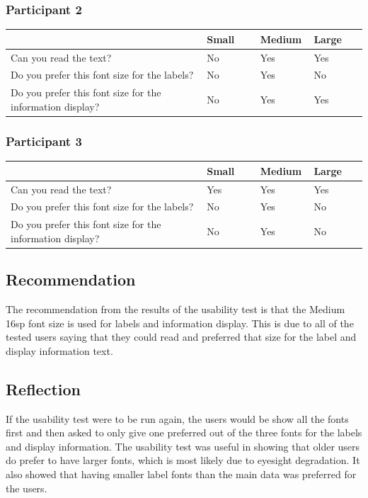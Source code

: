 \documentclass[11pt,english,numbers=endperiod,parskip=half]{scrartcl}
\begin{document}
\subsubsection{Participant 2}
\begin{table}[H]
	\begin{tabular}{| p{0.55\linewidth} | p{0.15\linewidth} | p{0.15\linewidth} | p{0.15 \linewidth} |}
		\hline
			&	Small	&	Medium	&	Large \\ \hline
		Can you read the text?	& No & Yes	& Yes \\ \hline
		Do you prefer this font size for the labels? & No & Yes & No \\ \hline
		Do you prefer this font size for the information display? & No & Yes & Yes \\
		\hline
	\end{tabular}
\end{table}

\subsubsection{Participant 3}
\begin{table}[H]
	\begin{tabular}{| p{0.55\linewidth} | p{0.15\linewidth} | p{0.15\linewidth} | p{0.15 \linewidth} |}
		\hline
			&	Small	&	Medium	&	Large \\ \hline
		Can you read the text?	& Yes	& Yes	& Yes \\ \hline
		Do you prefer this font size for the labels? & No & Yes & No \\ \hline
		Do you prefer this font size for the information display? & No & Yes & No \\
		\hline
	\end{tabular}
\end{table}

\subsection{Recommendation}
\raggedright
The recommendation from the results of the usability test is that the Medium 16sp font size is used for labels and information display. This is due to all of the tested users saying that they could read and preferred that size for the label and display information text.

\subsection{Reflection}
\raggedright
If the usability test were to be run again, the users would be show all the
fonts first and then asked to only give one preferred out of the three fonts
for the labels and display information. The usability test was useful in showing
that older users do prefer to have larger fonts, which is most likely due to
eyesight degradation. It also showed that having smaller label fonts than the
main data was preferred for the users.
\end{document}
